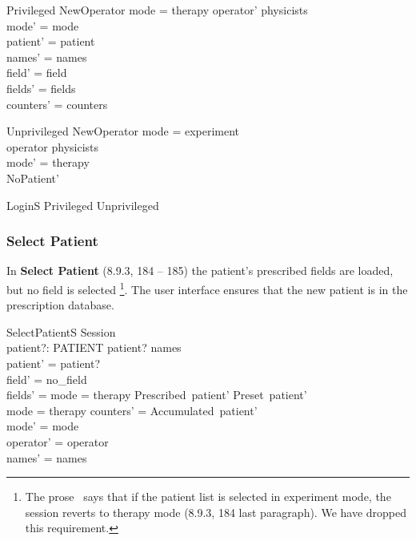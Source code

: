 \begin{schema}{Privileged}
	NewOperator
\where
	mode = therapy \lor operator' \in physicists \\
\also
	mode' = mode \\
	patient' = patient \\
	names' = names \\
	field' = field \\
	fields' = fields \\
	counters' = counters 
\end{schema}

\begin{schema}{Unprivileged}
	NewOperator
\where
        mode = experiment \\
        operator \notin physicists \\
	mode' = therapy \\
	NoPatient'
\end{schema}

\begin{zed}
LoginS  Privileged \lor Unprivileged
\end{zed}

\subsubsection{Select Patient}

In {\bf Select Patient} (8.9.3, 184 -- 185) the patient's
prescribed fields are loaded, but no field is selected
\footnote{The prose~\cite{jacky90d} says that if the patient list is
selected in experiment mode, the session reverts to therapy mode
(8.9.3, 184 last paragraph).  We have dropped this requirement.}.  The
user interface ensures that the new patient is in the prescription
database.

\begin{schema}{SelectPatientS}
	\Delta Session \\
	patient?: PATIENT
\where
	patient? \in names \\
	patient' = patient? \\
	field' = no\_field \\
	fields' = \IF mode = therapy \THEN Prescribed~patient' \ELSE Preset~patient' \\
	mode = therapy \implies counters' = Accumulated~patient' \\
\also
	mode' = mode  \\
	operator' = operator \\
	names' = names
\end{schema}

